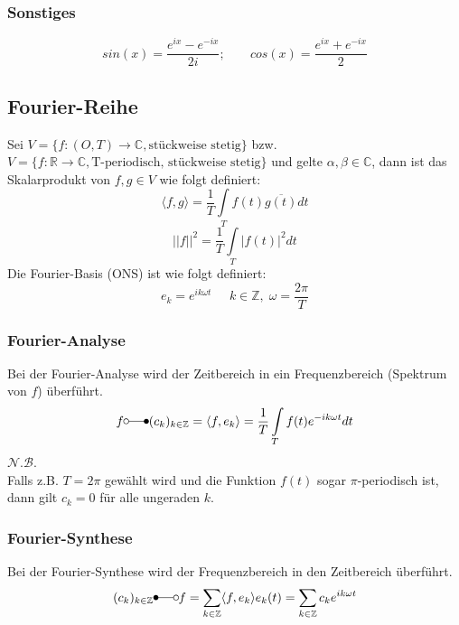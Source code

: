 \documentclass[a4paper,twocolumn,10pt]{article}
\begin{document}
\subsubsection{Sonstiges}
\begin{equation*}
sin(x)=\frac{e^{ix}-e^{-ix}}{2i};\;\;\;\;\;\;\;cos(x)=\frac{e^{ix}+e^{-ix}}{2}
\end{equation*}

\subsection{Fourier-Reihe}
Sei $V=\{f:(O,T)\rightarrow\mathbb{C},\text{stückweise stetig}\}$ bzw.\\
$V=\{f:\mathbb{R}\rightarrow\mathbb{C},\text{T-periodisch, stückweise stetig}\}$ und gelte $\alpha,\beta\in\mathbb{C}$, dann ist das Skalarprodukt von $f,g\in V$ wie folgt definiert:
\begin{equation*}
\langle f,g\rangle=\frac{1}{T}\int\limits_{T}f(t)\overline{g(t)}dt
\end{equation*}
\begin{equation*}
||f||^2=\frac{1}{T}\int\limits_{T}|f(t)|^2 dt
\end{equation*}
Die Fourier-Basis (ONS) ist wie folgt definiert:
\begin{equation*}
e_k=e^{ik\omega t}\;\;\;\;\;k\in\mathbb{Z},\;\omega=\frac{2\pi}{T}
\end{equation*}

\subsubsection{Fourier-Analyse}
Bei der Fourier-Analyse wird der Zeitbereich in ein Frequenzbereich (Spektrum von $f$) überführt.
\begin{equation*}
f\laplace (c_k)_{k\in\mathbb{Z}}=\langle f,e_k\rangle=\frac{1}{T}\int\limits_{T}f(t)e^{-ik\omega t}dt
\end{equation*}
\underline{$\mathcal{N.B.}$}\\
Falls z.B. $T=2\pi$ gewählt wird und die Funktion $f(t)$ sogar $\pi$-periodisch ist, dann gilt $c_k=0$ für alle ungeraden $k$.

\subsubsection{Fourier-Synthese}
Bei der Fourier-Synthese wird der Frequenzbereich in den Zeitbereich überführt.
\begin{equation*}
(c_k)_{k\in\mathbb{Z}}\Laplace f=\sum\limits_{k\in\mathbb{Z}}\langle f,e_k\rangle e_k(t)=\sum\limits_{k\in\mathbb{Z}}c_k e^{ik\omega t}
\end{equation*}
\end{document}
